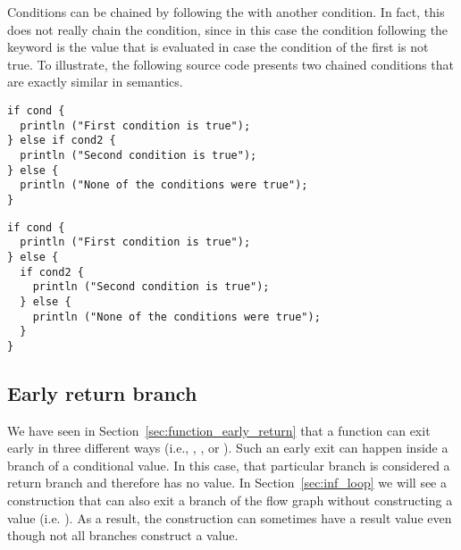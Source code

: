 Conditions can be chained by following the  with another
 condition. In fact, this does not really chain the condition, since
in this case the  condition following the  keyword is
the value that is evaluated in case the condition of the first  is
not true. To illustrate, the following source code presents two chained
 conditions that are exactly similar in semantics.


\begin{minipage}[t][][t]{0.47\linewidth}
\begin{lstlisting}[style=coloredverbatim, escapechar=@, caption=Using a \token{if} as the value of the \token{else} branch]
if cond {
  println ("First condition is true");
} else if cond2 {
  println ("Second condition is true");
} else {
  println ("None of the conditions were true");
}
\end{lstlisting}
\end{minipage}\hspace{10pt}%
\begin{minipage}[t][][t]{0.47\linewidth}
  \begin{lstlisting}[style=coloredverbatim, escapechar=@, caption=Using a block as the value of the \token{else} branch]
if cond {
  println ("First condition is true");
} else {
  if cond2 {
    println ("Second condition is true");
  } else {
    println ("None of the conditions were true");
  }
}
  \end{lstlisting}
\end{minipage}
\vspace{-10pt}%

\subsection{Early return branch}


We have seen in Section~\ref{sec:function_early_return} that a function can exit
early in three different ways (i.e., , , or
). Such an early exit can happen inside a branch of a conditional
value. In this case, that particular branch is considered a return branch and
therefore has no value. In Section~\ref{sec:inf_loop} we will see a construction
that can also exit a branch of the flow graph without constructing a value (i.e.
). As a result, the  construction can sometimes have a
result value even though not all branches construct a value.


